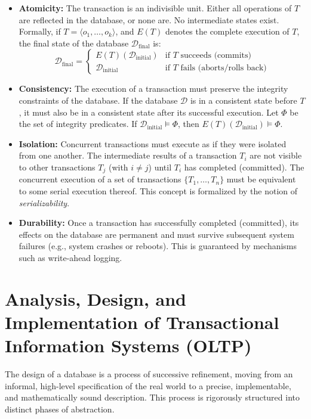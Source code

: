 \begin{itemize}
    \item \textbf{Atomicity:} The transaction is an indivisible unit. Either all operations of $T$ are reflected in the database, or none are. No intermediate states exist. Formally, if $T = \langle o_1, \dots, o_k \rangle$, and $E(T)$ denotes the complete execution of $T$, the final state of the database $\mathcal{D}_{\text{final}}$ is:
    \[ \mathcal{D}_{\text{final}} =
    \begin{cases}
        E(T)(\mathcal{D}_{\text{initial}}) & \text{if } T \text{ succeeds (commits)} \\
        \mathcal{D}_{\text{initial}} & \text{if } T \text{ fails (aborts/rolls back)}
    \end{cases}
    \]

    \item \textbf{Consistency:} The execution of a transaction must preserve the integrity constraints of the database. If the database $\mathcal{D}$ is in a consistent state before $T$, it must also be in a consistent state after its successful execution. Let $\Phi$ be the set of integrity predicates. If $\mathcal{D}_{\text{initial}} \models \Phi$, then $E(T)(\mathcal{D}_{\text{initial}}) \models \Phi$.

    \item \textbf{Isolation:} Concurrent transactions must execute as if they were isolated from one another. The intermediate results of a transaction $T_i$ are not visible to other transactions $T_j$ (with $i \neq j$) until $T_i$ has completed (committed). The concurrent execution of a set of transactions $\{T_1, \dots, T_n\}$ must be equivalent to some serial execution thereof. This concept is formalized by the notion of \textit{serializability}.

    \item \textbf{Durability:} Once a transaction has successfully completed (committed), its effects on the database are permanent and must survive subsequent system failures (e.g., system crashes or reboots). This is guaranteed by mechanisms such as write-ahead logging.
\end{itemize}

\chapter{Analysis, Design, and Implementation of Transactional Information Systems (OLTP)}

The design of a database is a process of successive refinement, moving from an informal, high-level specification of the real world to a precise, implementable, and mathematically sound description. This process is rigorously structured into distinct phases of abstraction.

